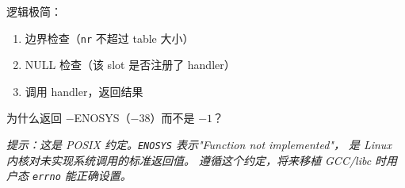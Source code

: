 逻辑极简：
\begin{enumerate}
  \item 边界检查（\texttt{nr} 不超过 table 大小）
  \item NULL 检查（该 slot 是否注册了 handler）
  \item 调用 handler，返回结果
\end{enumerate}

\begin{thinkbox}
为什么返回 $-$ENOSYS（$-38$）而不是 $-1$？

\emph{提示：这是 POSIX 约定。\texttt{ENOSYS} 表示"Function not implemented"，
是 Linux 内核对未实现系统调用的标准返回值。
遵循这个约定，将来移植 GCC/libc 时用户态 \texttt{errno} 能正确设置。}
\end{thinkbox}
